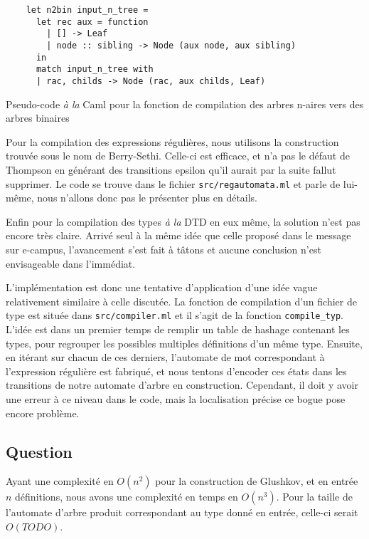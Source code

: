 \documentclass[twoside,12pt]{article}
\begin{document}
\begin{algorithm}
    \bigskip
\begin{verbatim}
    let n2bin input_n_tree =
      let rec aux = function
        | [] -> Leaf
        | node :: sibling -> Node (aux node, aux sibling)
      in
      match input_n_tree with
      | rac, childs -> Node (rac, aux childs, Leaf)
\end{verbatim}
   \caption{\small Pseudo-code \textit{à la} Caml pour la fonction de compilation des arbres
   n-aires vers des arbres binaires}
\end{algorithm}

Pour la compilation des expressions régulières, nous utilisons la construction trouvée sous
le nom de Berry-Sethi\footnotemark.
Celle-ci est efficace, et n'a pas le défaut de Thompson en générant des transitions
epsilon qu'il aurait par la suite fallut supprimer.
Le code se trouve dans le fichier \texttt{src/regautomata.ml} et parle de lui-même, nous n'allons
donc pas le présenter plus en détails.

Enfin pour la compilation des types \textit{à la} DTD en eux même,
la solution n'est pas encore très claire. Arrivé seul à la même idée
que celle proposé dans le message sur e-campus\footnotemark,
l'avancement s'est fait à tâtons et aucune conclusion n'est envisageable dans l'immédiat.

L'implémentation est donc une tentative d'application d'une idée vague relativement similaire à
celle discutée. La fonction de compilation d'un fichier de type est située dans
\texttt{src/compiler.ml} et il s'agit de la fonction \texttt{compile\_typ}.
L'idée est dans un premier temps de remplir un table de hashage contenant les types, pour
regrouper les possibles multiples définitions d'un même type. Ensuite, en itérant sur chacun
de ces derniers, l'automate de mot correspondant à l'expression régulière est fabriqué, et
nous tentons d'encoder ces états dans les transitions de notre automate d'arbre en construction.
Cependant, il doit y avoir une erreur à ce niveau dans le code, mais la localisation précise
ce bogue pose encore problème.



\subsection{Question}
Ayant une complexité en $O(n^2)$ pour la construction de Glushkov, et en entrée $n$ définitions,
nous avons une complexité en temps en $O(n^3)$\footnotemark.
Pour la taille de l'automate d'arbre produit correspondant
au type donné en entrée, celle-ci serait $O(TODO)$.
\end{document}
